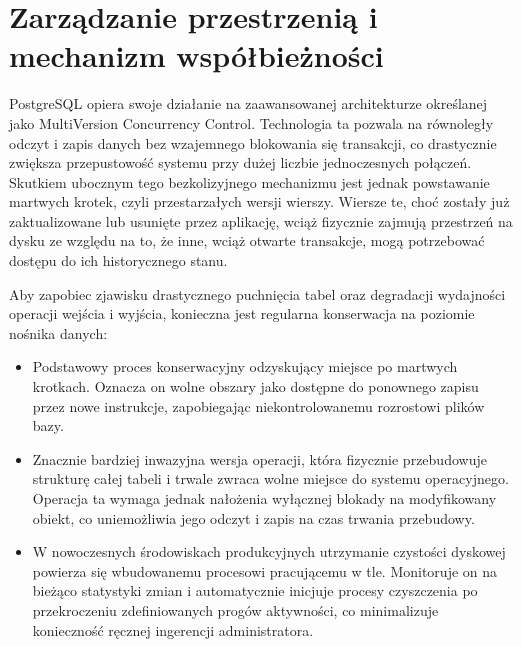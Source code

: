 \documentclass[letterpaper,10pt,english]{sphinxmanual}
\begin{document}
\section{Zarządzanie przestrzenią i mechanizm współbieżności}
\label{\detokenize{rozdzial_1/index:zarzadzanie-przestrzenia-i-mechanizm-wspolbieznosci}}
\sphinxAtStartPar
PostgreSQL opiera swoje działanie na zaawansowanej architekturze określanej jako Multi\sphinxhyphen{}Version Concurrency Control. Technologia ta pozwala na równoległy odczyt i zapis danych bez wzajemnego blokowania się transakcji, co drastycznie zwiększa przepustowość systemu przy dużej liczbie jednoczesnych połączeń. Skutkiem ubocznym tego bezkolizyjnego mechanizmu jest jednak powstawanie martwych krotek, czyli przestarzałych wersji wierszy. Wiersze te, choć zostały już zaktualizowane lub usunięte przez aplikację, wciąż fizycznie zajmują przestrzeń na dysku ze względu na to, że inne, wciąż otwarte transakcje, mogą potrzebować dostępu do ich historycznego stanu.

\sphinxAtStartPar
Aby zapobiec zjawisku drastycznego puchnięcia tabel oraz degradacji wydajności operacji wejścia i wyjścia, konieczna jest regularna konserwacja na poziomie nośnika danych:
\begin{itemize}
\item {} 
\sphinxAtStartPar
{} Podstawowy proces konserwacyjny odzyskujący miejsce po martwych krotkach. Oznacza on wolne obszary jako dostępne do ponownego zapisu przez nowe instrukcje, zapobiegając niekontrolowanemu rozrostowi plików bazy.

\item {} 
\sphinxAtStartPar
{} Znacznie bardziej inwazyjna wersja operacji, która fizycznie przebudowuje strukturę całej tabeli i trwale zwraca wolne miejsce do systemu operacyjnego. Operacja ta wymaga jednak nałożenia wyłącznej blokady na modyfikowany obiekt, co uniemożliwia jego odczyt i zapis na czas trwania przebudowy.

\item {} 
\sphinxAtStartPar
{} W nowoczesnych środowiskach produkcyjnych utrzymanie czystości dyskowej powierza się wbudowanemu procesowi pracującemu w tle. Monitoruje on na bieżąco statystyki zmian i automatycznie inicjuje procesy czyszczenia po przekroczeniu zdefiniowanych progów aktywności, co minimalizuje konieczność ręcznej ingerencji administratora.

\end{itemize}
\end{document}
